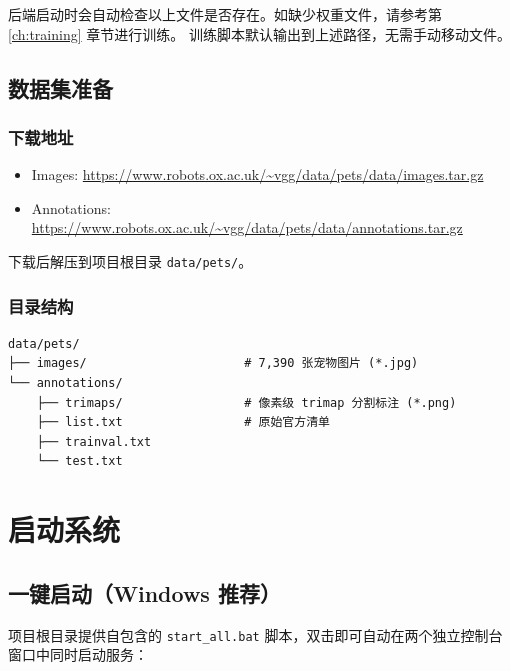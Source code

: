 \documentclass[12pt, a4paper, openany]{ctexbook}
\begin{document}
\begin{warnbox}
后端启动时会自动检查以上文件是否存在。如缺少权重文件，请参考第 \ref{ch:training} 章节进行训练。
训练脚本默认输出到上述路径，无需手动移动文件。
\end{warnbox}

\section{数据集准备}

\subsection{下载地址}

\begin{itemize}
  \item Images: \url{https://www.robots.ox.ac.uk/~vgg/data/pets/data/images.tar.gz}
  \item Annotations: \url{https://www.robots.ox.ac.uk/~vgg/data/pets/data/annotations.tar.gz}
\end{itemize}

下载后解压到项目根目录 \texttt{data/pets/}。

\subsection{目录结构}

\begin{verbatim}
data/pets/
├── images/                      # 7,390 张宠物图片 (*.jpg)
└── annotations/
    ├── trimaps/                 # 像素级 trimap 分割标注 (*.png)
    ├── list.txt                 # 原始官方清单
    ├── trainval.txt
    └── test.txt
\end{verbatim}

\chapter{启动系统}

\section{一键启动（Windows 推荐）}

项目根目录提供自包含的 \texttt{start\_all.bat} 脚本，双击即可自动在两个独立控制台窗口中同时启动服务：
\end{document}
